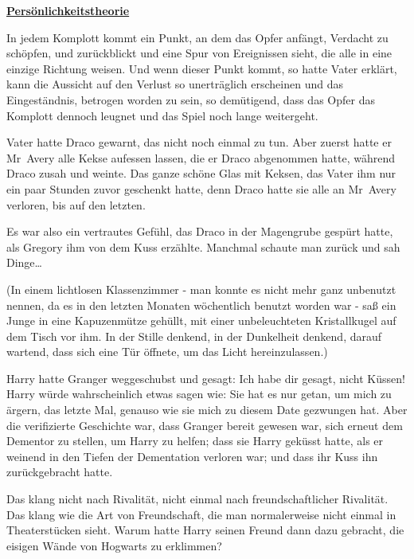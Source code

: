 

\hypertarget{persuxf6nlichkeitstheorie}{%

\textbf{\uline{Persönlichkeitstheorie}}

In jedem Komplott kommt ein Punkt, an dem das Opfer anfängt, Verdacht zu schöpfen, und zurückblickt und eine Spur von Ereignissen sieht, die alle in eine einzige Richtung weisen. Und wenn dieser Punkt kommt, so hatte Vater erklärt, kann die Aussicht auf den Verlust so unerträglich erscheinen und das Eingeständnis, betrogen worden zu sein, so demütigend, dass das Opfer das Komplott dennoch leugnet und das Spiel noch lange weitergeht.

Vater hatte Draco gewarnt, das nicht noch einmal zu tun. Aber zuerst hatte er Mr~Avery alle Kekse aufessen lassen, die er Draco abgenommen hatte, während Draco zusah und weinte. Das ganze schöne Glas mit Keksen, das Vater ihm nur ein paar Stunden zuvor geschenkt hatte, denn Draco hatte sie alle an Mr~Avery verloren, bis auf den letzten.

Es war also ein vertrautes Gefühl, das Draco in der Magengrube gespürt hatte, als Gregory ihm von dem Kuss erzählte. Manchmal schaute man zurück und sah Dinge…

(In einem lichtlosen Klassenzimmer - man konnte es nicht mehr ganz unbenutzt nennen, da es in den letzten Monaten wöchentlich benutzt worden war - saß ein Junge in eine Kapuzenmütze gehüllt, mit einer unbeleuchteten Kristallkugel auf dem Tisch vor ihm. In der Stille denkend, in der Dunkelheit denkend, darauf wartend, dass sich eine Tür öffnete, um das Licht hereinzulassen.)

Harry hatte Granger weggeschubst und gesagt: Ich habe dir gesagt, nicht Küssen! Harry würde wahrscheinlich etwas sagen wie: Sie hat es nur getan, um mich zu ärgern, das letzte Mal, genauso wie sie mich zu diesem Date gezwungen hat. Aber die verifizierte Geschichte war, dass Granger bereit gewesen war, sich erneut dem Dementor zu stellen, um Harry zu helfen; dass sie Harry geküsst hatte, als er weinend in den Tiefen der Dementation verloren war; und dass ihr Kuss ihn zurückgebracht hatte.

Das klang nicht nach Rivalität, nicht einmal nach freundschaftlicher Rivalität. Das klang wie die Art von Freundschaft, die man normalerweise nicht einmal in Theaterstücken sieht. Warum hatte Harry seinen Freund dann dazu gebracht, die eisigen Wände von Hogwarts zu erklimmen?

}
